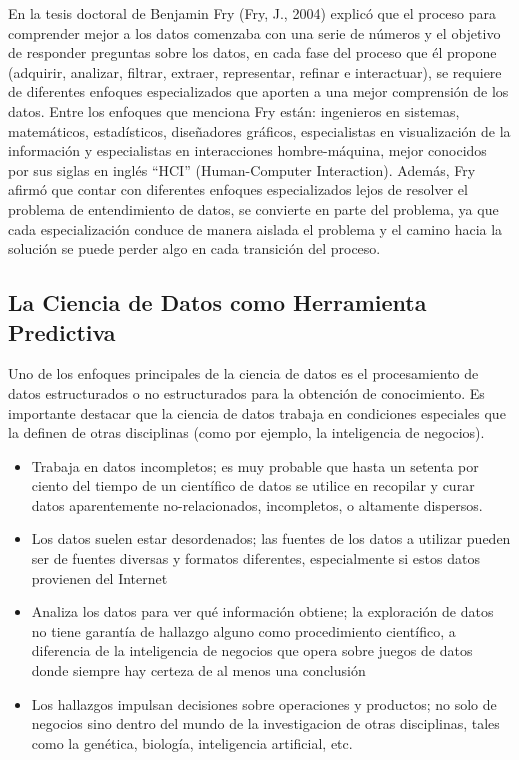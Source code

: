 \documentclass[letterpaper, spanish, 11pt]{report}
\begin{document}
En la tesis doctoral de Benjamin Fry (Fry, J., 2004) explicó que el proceso para comprender mejor a los datos comenzaba con una serie de números y el objetivo de responder preguntas sobre los datos, en cada fase del proceso que él propone (adquirir, analizar, filtrar, extraer, representar, refinar e interactuar), se requiere de diferentes enfoques especializados que aporten a una mejor comprensión de los datos. Entre los enfoques que menciona Fry están: ingenieros en sistemas, matemáticos, estadísticos, diseñadores gráficos, especialistas en visualización de la información y especialistas en interacciones hombre-máquina, mejor conocidos por sus siglas en inglés “HCI” (Human-Computer Interaction). Además, Fry afirmó que contar con diferentes enfoques especializados lejos de resolver el problema de entendimiento de datos, se convierte en parte del problema, ya que cada especialización conduce de manera aislada el problema y el camino hacia la solución se puede perder algo en cada transición del proceso.

\subsection{La Ciencia de Datos como Herramienta Predictiva}
Uno de los enfoques principales de la ciencia de datos es el procesamiento de datos estructurados o no estructurados para la obtención de conocimiento. Es importante destacar que la ciencia de datos trabaja en condiciones especiales que la definen de otras disciplinas (como por ejemplo, la inteligencia de negocios). 

\begin{itemize}
	\item Trabaja en datos incompletos; es muy probable que hasta un setenta por ciento del tiempo de un científico de datos se utilice en recopilar y curar datos aparentemente no-relacionados, incompletos, o altamente dispersos. 
	\item Los datos suelen estar desordenados; las fuentes de los datos a utilizar pueden ser de fuentes diversas y formatos diferentes, especialmente si estos datos provienen del Internet
	\item Analiza los datos para ver qué información obtiene; la exploración de datos no tiene garantía de hallazgo alguno como procedimiento científico, a diferencia de la inteligencia de negocios que opera sobre juegos de datos donde siempre hay certeza de al menos una conclusión 
	\item Los hallazgos impulsan decisiones sobre operaciones y productos; no solo de negocios sino dentro del mundo de la investigacion de otras disciplinas, tales como la genética, biología, inteligencia artificial, etc.
\end{itemize}
\end{document}
